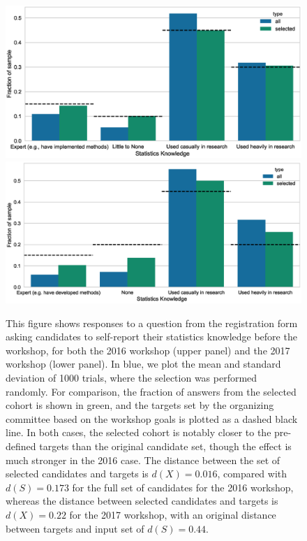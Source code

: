 \documentclass[10pt,letterpaper]{article}
\begin{document}
\begin{figure}[h!]
\begin{center}
\includegraphics[width=15cm]{Fig4a.eps}
\includegraphics[width=15cm]{Fig4b.eps}
\caption{This figure shows responses to a question from the registration form asking candidates to self-report their statistics knowledge before the workshop, for both the 2016 workshop (upper panel) and the 2017 workshop (lower panel). In blue, we plot the mean and standard deviation of 1000 trials, where the selection was performed randomly.%
For comparison, the fraction of answers from the selected cohort is shown in green, and the targets set by the organizing committee based on the workshop goals is plotted as a dashed black line.
In both cases, the selected cohort is notably closer to the pre-defined targets than the original candidate set, though the effect is much stronger in the 2016 case.
The distance between the set of selected candidates and targets is $d(X)=0.016$, compared with $d(S)=0.173$ for the full set of candidates for the 2016 workshop, whereas the distance between selected candidates and targets is $d(X)=0.22$ for the 2017 workshop, with an original distance between targets and input set of $d(S)=0.44$.}
\label{fig:entrofy_stats}
\end{center}
\end{figure}
\end{document}
